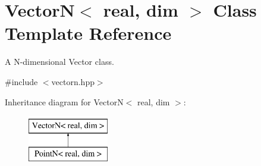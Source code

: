 \hypertarget{classVectorN}{
\section{VectorN$<$ real, dim $>$ Class Template Reference}
\label{classVectorN}
}


A N-\/dimensional Vector class.  




{\ttfamily \#include $<$vectorn.hpp$>$}

Inheritance diagram for VectorN$<$ real, dim $>$:\begin{figure}[H]
\begin{center}
\leavevmode
\includegraphics[height=2.000000cm]{classVectorN}
\end{center}
\end{figure}
